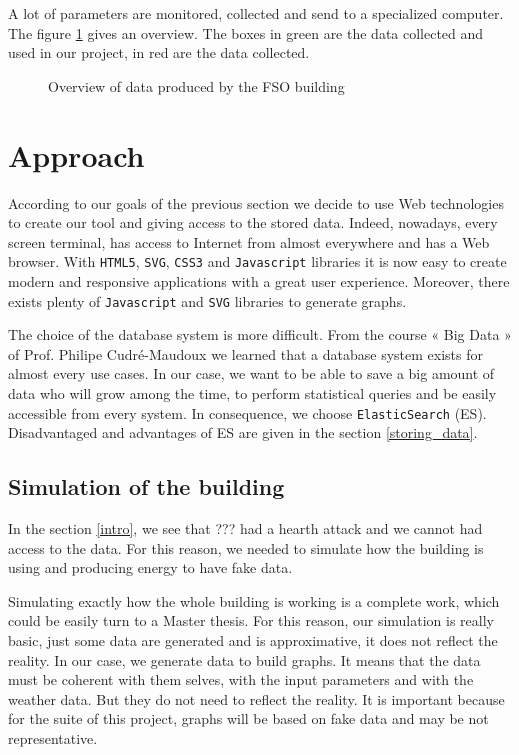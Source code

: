 \documentclass{acm_proc_article-sp}
\begin{document}
A lot of parameters are monitored, collected and send to a specialized computer. The figure \ref{fig1} gives an overview. The boxes in green are the data collected and used in our project, in red are the data collected.

\begin{figure}
\label{fig1}
\caption{Overview of data produced by the FSO building}
\end{figure}

\section{Approach}
\label{approach}
According to our goals of the previous section we decide to use Web technologies to create our tool and giving access to the stored data. Indeed, nowadays, every screen terminal, has access to Internet from almost everywhere and has a Web browser. With \texttt{HTML5}, \texttt{SVG}, \texttt{CSS3} and \texttt{Javascript} libraries it is now easy to create modern and responsive applications with a great user experience. Moreover, there exists plenty of \texttt{Javascript} and \texttt{SVG} libraries to generate graphs.

The choice of the database system is more difficult. From the course « Big Data » of Prof. Philipe Cudré-Maudoux we learned that a database system exists for almost every use cases. In our case, we want to be able to save a big amount of data who will grow among the time, to perform statistical queries and be easily accessible from every system. In consequence, we choose \texttt{ElasticSearch} (ES). Disadvantaged and advantages of ES are given in the section \ref{storing_data}.

\subsection{Simulation of the building}
In the section \ref{intro}, we see that ??? had a hearth attack and we cannot had access to the data. For this reason, we needed to simulate how the building is using and producing energy to have fake data.

Simulating exactly how the whole building is working is a complete work, which could be easily turn to a Master thesis. For this reason, our simulation is really basic, just some data are generated and is approximative, it does not reflect the reality. In our case, we generate data to build graphs. It means that the data must be coherent with them selves, with the input parameters and with the weather data. But they do not need to reflect the reality. It is important because for the suite of this project, graphs will be based on fake data and may be not representative.
\end{document}
